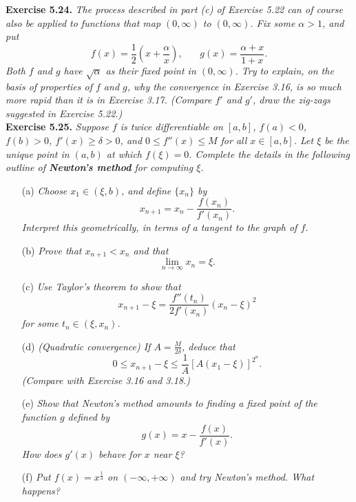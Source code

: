 \documentclass{article}
\begin{document}



\textbf{Exercise 5.24.}
\emph{The process described in part (c) of Exercise 5.22 can of course also be applied to
functions that map $(0,\infty)$ to $(0,\infty)$.
Fix some $\alpha > 1$, and put
\[
  f(x) = \frac{1}{2} \left( x + \frac{\alpha}{x} \right), \:\:\:\:\:\:\:\:
  g(x) = \frac{\alpha + x}{1 + x}.
\]
Both $f$ and $g$ have $\sqrt{\alpha}$ as their fixed point in $(0,\infty)$.
Try to explain, on the basis of properties of $f$ and $g$,
why the convergence in Exercise 3.16, is so much more rapid than it is in Exercise 3.17.
(Compare $f'$ and $g'$, draw the zig-zags suggested in Exercise 5.22.)} \\






\textbf{Exercise 5.25.}
\emph{Suppose $f$ is twice differentiable on $[a,b]$,
$f(a) < 0$, $f(b) > 0$, $f'(x) \geq \delta > 0$,
and $0 \leq f''(x) \leq M$ for all $x \in [a,b]$.
Let $\xi$ be the unique point in $(a,b)$ at which $f(\xi) = 0$.
Complete the details in the following outline of
\textbf{Newton's method} for computing $\xi$.}
\begin{enumerate}
\item[(a)]
\emph{Choose $x_1 \in (\xi,b)$, and define $\{ x_n \}$ by
\[
  x_{n+1} = x_n - \frac{f(x_n)}{f'(x_n)}.
\]
Interpret this geometrically, in terms of a tangent to the graph of $f$.}

\item[(b)]
\emph{Prove that $x_{n+1} < x_n$ and that
\[
  \lim_{n \to \infty}{x_n} = \xi.
\]}
\item[(c)]
\emph{Use Taylor's theorem to show that
\[
  x_{n+1} - \xi = \frac{f''(t_n)}{2 f'(x_n)} (x_n-\xi)^2
\]
for some $t_n \in (\xi,x_n)$.}

\item[(d)]
\emph{(Quadratic convergence)
If $A = \frac{M}{2\delta}$, deduce that
\[
  0 \leq x_{n+1} - \xi \leq \frac{1}{A} [A(x_1 - \xi)]^{2^n}.
\]
(Compare with Exercise 3.16 and 3.18.)}

\item[(e)]
\emph{Show that Newton's method amounts to finding a fixed point of the function $g$ defined by
\[
  g(x) = x - \frac{f(x)}{f'(x)}.
\]
How does $g'(x)$ behave for $x$ near $\xi$?}

\item[(f)]
\emph{Put $f(x) = x^{\frac{1}{3}}$ on $(-\infty, +\infty)$ and try Newton's method.
What happens?} \\
\end{enumerate}
\end{document}
